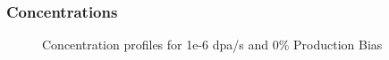 \documentclass[a4paper]{article}
\begin{document}
    \subsubsection{Concentrations}
      \begin{figure}[h!]  %
        \centering
        \qquad
        \caption{Concentration profiles for 1e-6 dpa/s and 0\% Production Bias}
        \label{figure:7}
      \end{figure}
\end{document}
